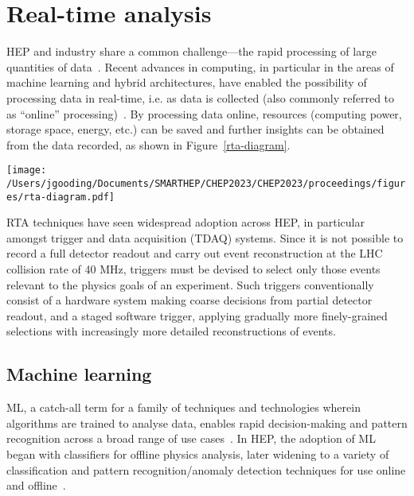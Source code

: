 \section{Real-time analysis}
\label{rta}
HEP and industry share a common challenge—the rapid processing of large quantities of data~\cite{hu-big-data}. Recent advances in computing, in particular in the areas of machine learning and hybrid architectures, have enabled the possibility of processing data in real-time, i.e. as data is collected (also commonly referred to as ``online'' processing)~\cite{real-time-computing}. By processing data online, resources (computing power, storage space, energy, etc.) can be saved and further insights can be obtained from the data recorded, as shown in Figure~\ref{rta-diagram}.

\begin{figure*}[h!]
    \centering
    \texttt{[image: /Users/jgooding/Documents/SMARTHEP/CHEP2023/CHEP2023/proceedings/figures/rta-diagram.pdf]}
    \caption{Traditional and RTA approaches to data processing. Traditional approaches rely on recording all data and processing this offline; in RTA, data is processed as it is produced, recording only the relevant portions, enabling greater volumes of processed data to be stored.}
    \label{rta-diagram}
\end{figure*}

RTA techniques have seen widespread adoption across HEP, in particular amongst trigger and data acquisition (TDAQ) systems. Since it is not possible to record a full detector readout and carry out event reconstruction at the LHC collision rate of {40}{ MHz}, triggers must be devised to select only those events relevant to the physics goals of an experiment. Such triggers conventionally consist of a hardware system making coarse decisions from partial detector readout, and a staged software trigger, applying gradually more finely-grained selections with increasingly more detailed reconstructions of events.

\subsection{Machine learning}
\label{machine-learning}
ML, a catch-all term for a family of techniques and technologies wherein algorithms are trained to analyse data, enables rapid decision-making and pattern recognition across a broad range of use cases~\cite{intro-ml}. In HEP, the adoption of ML began with classifiers for offline physics analysis, later widening to a variety of classification and pattern recognition/anomaly detection techniques for use online and offline~\cite{albertsson-ml}.

